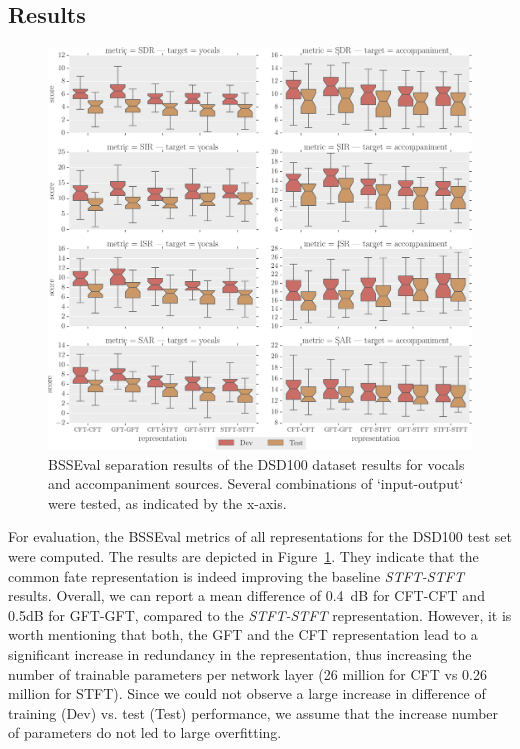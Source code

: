 \subsection{Results}

\begin{figure}[t]
\centering
\includegraphics[width=1.1\textwidth]{Chapters/06_Separation_Unknown/figures/boxplot.pdf}
\caption{BSSEval separation results of the DSD100 dataset results for vocals and accompaniment sources. Several combinations of `input-output` were tested, as indicated by the x-axis.}
\label{fig:deep_cft_boxplots}
\end{figure}

For evaluation, the BSSEval metrics of all representations for the DSD100 test set were computed.
The results are depicted in Figure~\ref{fig:deep_cft_boxplots}.
They indicate that the common fate representation is indeed improving the baseline \emph{STFT-STFT} results.
Overall, we can report a mean difference of 0.4~dB for CFT-CFT and 0.5dB for GFT-GFT, compared to the \emph{STFT-STFT} representation.
However, it is worth mentioning that both, the GFT and the CFT representation lead to a significant increase in redundancy in the representation, thus increasing the number of trainable parameters per network layer (26 million for CFT vs 0.26 million for STFT). Since we could not observe a large increase in difference of training (Dev) vs. test (Test) performance, we assume that the increase number of parameters do not led to large overfitting.

